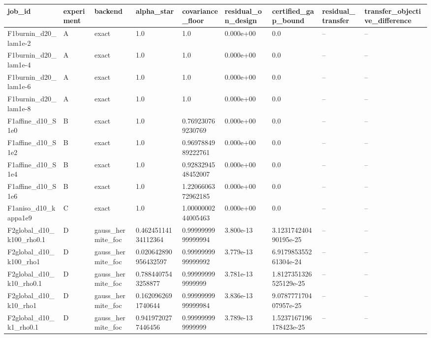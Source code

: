 \begin{tabular}{lllllllll}
\toprule
job\_id & experiment & backend & alpha\_star & covariance\_floor & residual\_on\_design & certified\_gap\_bound & residual\_transfer & transfer\_objective\_difference \\
\midrule
F1burnin\_d20\_lam1e-2 & A & exact & 1.0 & 1.0 & 0.000e+00 & 0.0 & -- & -- \\
F1burnin\_d20\_lam1e-4 & A & exact & 1.0 & 1.0 & 0.000e+00 & 0.0 & -- & -- \\
F1burnin\_d20\_lam1e-6 & A & exact & 1.0 & 1.0 & 0.000e+00 & 0.0 & -- & -- \\
F1burnin\_d20\_lam1e-8 & A & exact & 1.0 & 1.0 & 0.000e+00 & 0.0 & -- & -- \\
F1affine\_d10\_S1e0 & B & exact & 1.0 & 0.769230769230769 & 0.000e+00 & 0.0 & -- & -- \\
F1affine\_d10\_S1e2 & B & exact & 1.0 & 0.9697884989222761 & 0.000e+00 & 0.0 & -- & -- \\
F1affine\_d10\_S1e4 & B & exact & 1.0 & 0.9283294548452007 & 0.000e+00 & 0.0 & -- & -- \\
F1affine\_d10\_S1e6 & B & exact & 1.0 & 1.2206606372962185 & 0.000e+00 & 0.0 & -- & -- \\
F1aniso\_d10\_kappa1e9 & C & exact & 1.0 & 1.0000000244005463 & 0.000e+00 & 0.0 & -- & -- \\
F2global\_d10\_k100\_rho0.1 & D & gauss\_hermite\_foc & 0.46245114134112364 & 0.9999999999999994 & 3.800e-13 & 3.123174240490195e-25 & -- & -- \\
F2global\_d10\_k100\_rho1 & D & gauss\_hermite\_foc & 0.020642890956432597 & 0.9999999999999992 & 3.779e-13 & 6.917985355261304e-24 & -- & -- \\
F2global\_d10\_k10\_rho0.1 & D & gauss\_hermite\_foc & 0.7884407543258877 & 0.999999999999999 & 3.781e-13 & 1.8127351326525129e-25 & -- & -- \\
F2global\_d10\_k10\_rho1 & D & gauss\_hermite\_foc & 0.1620962691740644 & 0.9999999999999984 & 3.836e-13 & 9.078777170407957e-25 & -- & -- \\
F2global\_d10\_k1\_rho0.1 & D & gauss\_hermite\_foc & 0.9419720277446456 & 0.999999999999999 & 3.789e-13 & 1.5237167196178423e-25 & -- & -- \\

\end{tabular}
